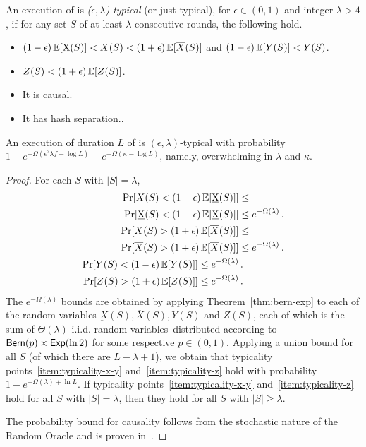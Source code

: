 \begin{definition}
  An execution of \poem is \emph{($\epsilon,\lambda$)-typical} (or just typical),
  for $\epsilon \in (0,1)$ and integer $\lambda > 4$, if for any set $S$ of at
  least $\lambda$ consecutive rounds, the following hold.
  \begin{itemize}
    \item $(1 - \epsilon) \mathop{{}\mathbb{E}}[\underbar{X}(S)] < X(S) < (1 + \epsilon) \mathop{{}\mathbb{E}}[\overline{X}(S)]$ and $(1-\epsilon) \mathop{{}\mathbb{E}}[Y(S)] < Y(S)$.\label{item:typicality-x-y}
    \item $Z(S) < (1 + \epsilon)\mathop{{}\mathbb{E}}[Z(S)]$.\label{item:typicality-z}
    \item It is causal.\label{item:typicality-causal}
    \item It has hash separation..\label{item:typicality-hash-separation}
  \end{itemize}
\end{definition}

\begin{theorem}[Typicality]
  An execution of duration $L$ of \poem is $(\epsilon, \lambda)$-typical with
  probability $1 - e^{-\Omega(\epsilon^2\lambda f - \log L)} - e^{-\Omega(\kappa - \log L)}$,
  namely, overwhelming in $\lambda$ and $\kappa$.
\end{theorem}
\begin{proof}
  For each $S$ with $|S| = \lambda$,
  \begin{align*}
    \Pr[X(S) < (1 - \epsilon)\mathop{{}\mathbb{E}}[\underbar{X}(S)]] &\leq\\
    \Pr[\underbar{X}(S) < (1 - \epsilon)\mathop{{}\mathbb{E}}[\underbar{X}(S)]] &\leq
    e^{-\Omega(\lambda)} \,.\\
    \Pr[X(S) > (1 + \epsilon)\mathop{{}\mathbb{E}}[\overline{X}(S)]] &\leq\\
    \Pr[\overline{X}(S) > (1 + \epsilon)\mathop{{}\mathbb{E}}[\overline{X}(S)]] &\leq
    e^{-\Omega(\lambda)} \,.\\
    \Pr[Y(S) < (1 - \epsilon)\mathop{{}\mathbb{E}}[Y(S)]] \leq e^{-\Omega(\lambda)} &\,.\\
    \Pr[Z(S) > (1 + \epsilon)\mathop{{}\mathbb{E}}[Z(S)]] \leq e^{-\Omega(\lambda)} &\,.\\
  \end{align*}
  The $e^{-\Omega(\lambda)}$ bounds are obtained by applying
  Theorem~\ref{thm:bern-exp} to each of the random variables
  $\underbar{X}(S), \overline{X}(S), Y(S)$ and $Z(S)$, each
  of which is the sum of $\Theta(\lambda)$ i.i.d. random variables\
  distributed according to $\textsf{Bern}(p) \times \textsf{Exp}(\ln2)$ for
  some respective $p \in (0, 1)$.
  Applying a union bound for all $S$ (of which there are $L - \lambda + 1$),
  we obtain that typicality
  points~\ref{item:typicality-x-y} and~\ref{item:typicality-z}
  hold with probability $1 - e^{-\Omega(\lambda)+\ln L}$.
  If typicality points~\ref{item:typicality-x-y} and~\ref{item:typicality-z}
  hold for all $S$ with $|S| = \lambda$, then they hold for all $S$ with
  $|S| \geq \lambda$.


  The probability bound for causality follows from the stochastic nature
  of the Random Oracle and is proven in~\cite{backbone}.
  \Qed
\end{proof}

